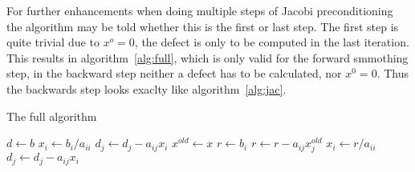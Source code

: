 \documentclass{article}
\begin{document}
For further enhancements when doing multiple steps of Jacobi preconditioning the algorithm may be told whether this is the first or last step. The first step is quite trivial due to $x^o=0$, the defect is only to be computed in the last iteration. This results in algorithm~\ref{alg:full}, which is only valid for the forward smmothing step, in the backward step neither a defect has to be calculated, nor $x^0=0$. Thus the backwards step looks exaclty like algorithm~\ref{alg:jac}.

\begin{algorithm}
\caption{The full algorithm}
\label{alg:full}
\begin{algorithmic}[1]
  \State $d\gets b$
\EndIf
{}
    \State $x_i\gets b_i/a_{ii}$
  \EndFor
      \State $d_j\gets d_j - a_{ij}x_{i}$
    \EndFor
  \EndIf
\Else
  \State $x^{old}\gets x$
    \State $r\gets b_i$
      \State $r\gets r-a_{ij}x^{old}_j$
    \EndFor
    \State $x_i\gets r/a_{ii}$
        \State $d_j\gets d_j - a_{ij}x_{i}$
      \EndFor
    \EndIf
  \EndFor
\EndIf

\end{algorithmic}
\end{algorithm}
\end{document}
